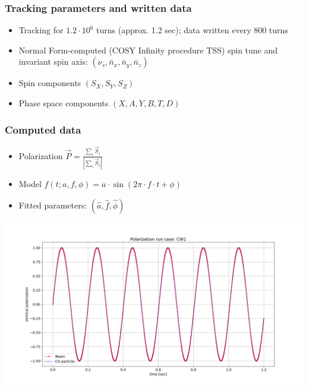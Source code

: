 \documentclass{beamer}
\begin{document}
\begin{frame}\frametitle{Tracking parameters and written data}
  \begin{itemize}
  \item Tracking for $1.2\cdot 10^6$ turns (approx. 1.2 sec); data written every 800 turns
  \item Normal Form-computed (COSY Infinity procedure TSS) spin tune and invariant spin axis: $(\nu_s, \bar n_x, \bar n_y, \bar n_z)$
  \item Spin components $(S_X, S_Y, S_Z)$
  \item Phase space components $(X, A, Y, B, T, D)$
  \end{itemize}
\end{frame}

\begin{frame}\frametitle{Computed data}
  \begin{itemize}
  \item Polarization $\vec P = \frac{\sum_i\vec S_i}{|\sum_i\vec S_i|}$
  \item Model  $f(t; a,f,\phi) = a\cdot \sin(2\pi\cdot f\cdot t + \phi)$
  \item Fitted parameters:  $(\hat a, \hat f, \hat\phi)$
  \end{itemize}
  \centering
  \includegraphics[width=\linewidth]{PY_plot}
\end{frame}
\end{document}
